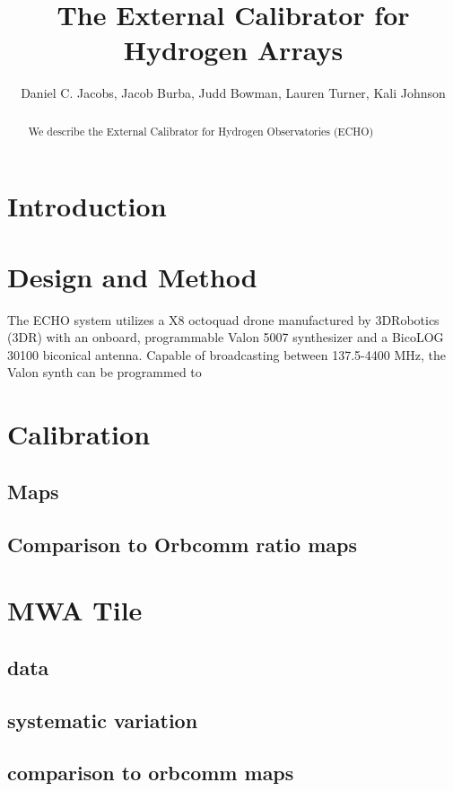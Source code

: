 \documentclass[preprint2]{aastex}
\begin{document}
\title{The External Calibrator for Hydrogen Arrays}
\author{
Daniel C. Jacobs,
Jacob Burba,
Judd Bowman,
Lauren Turner,
Kali Johnson}



\begin{abstract}
We describe the External Calibrator for Hydrogen Observatories (ECHO) 
\end{abstract}



\section{Introduction}\label{sec:intro}

\section{Design and Method}

The ECHO system utilizes a X8 octoquad drone manufactured by 3DRobotics (3DR) with an onboard, programmable Valon 5007 synthesizer and a BicoLOG 30100 biconical antenna.  Capable of broadcasting between 137.5-4400 MHz, the Valon synth can be programmed to 

\section{Calibration}
\subsection{Maps}
\subsection{Comparison to Orbcomm ratio maps}
\section{MWA Tile}
\subsection{data}
\subsection{systematic variation}
\subsection{comparison to orbcomm maps}
\end{document}
